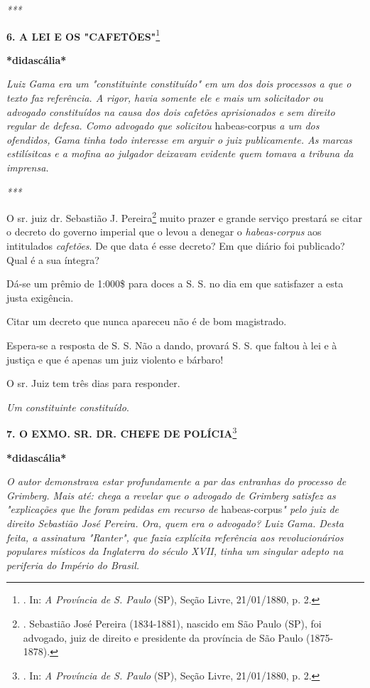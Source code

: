 \emph{***}

\textbf{6. A LEI E OS "CAFETÕES"}\footnote{. In: \emph{A Província de S.
  Paulo} (SP), Seção Livre, 21/01/1880, p. 2.}

\textbf{*didascália*}

\emph{Luiz Gama era um "constituinte constituído" em um dos dois
processos a que o texto faz referência. A rigor, havia somente ele e
mais um solicitador ou advogado constituídos na causa dos dois cafetões
aprisionados e sem direito regular de defesa. Como advogado que
solicitou} habeas-corpus \emph{a um dos ofendidos, Gama tinha todo
interesse em arguir o juiz publicamente. As marcas estilísitcas e a
mofina ao julgador deixavam evidente quem tomava a tribuna da imprensa.}

\emph{***}

O sr. juiz dr. Sebastião J. Pereira\footnote{. Sebastião José Pereira
  (1834-1881), nascido em São Paulo (SP), foi advogado, juiz de direito
  e presidente da província de São Paulo (1875-1878).}
muito prazer e grande
serviço prestará se citar o decreto do governo imperial que o levou a
denegar o \emph{habeas-corpus} aos intitulados \emph{cafetões}. De que
data é esse decreto? Em que diário foi publicado? Qual é a sua íntegra?

Dá-se um prêmio de 1:000\$ para doces a S. S. no dia em que satisfazer a
esta justa exigência.

Citar um decreto que nunca apareceu não é de bom magistrado.

Espera-se a resposta de S. S. Não a dando, provará S. S. que faltou à
lei e à justiça e que é apenas um juiz violento e bárbaro!

O sr. Juiz tem três dias para responder.

\emph{Um constituinte constituído}.

\textbf{7. O EXMO. SR. DR. CHEFE DE POLÍCIA}\footnote{. In: \emph{A
  Província de S. Paulo} (SP), Seção Livre, 21/01/1880, p. 2.}

\textbf{*didascália*}

\emph{O autor demonstrava estar profundamente a par das entranhas do
processo de Grimberg. Mais até: chega a revelar que o advogado de
Grimberg satisfez as "explicações que lhe foram pedidas em recurso de}
habeas-corpus\emph{" pelo juiz de direito Sebastião José Pereira. Ora,
quem era o advogado? Luiz Gama. Desta feita, a assinatura "Ranter", que
fazia explícita referência aos revolucionários populares místicos da
Inglaterra do século XVII, tinha um singular adepto na periferia do
Império do Brasil.}

